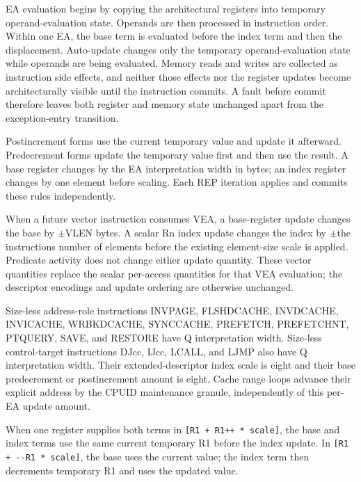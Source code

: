 EA evaluation begins by copying the architectural registers into temporary operand-evaluation state. Operands are
then processed in instruction order. Within one EA, the base term is evaluated before the index term and then the
displacement. Auto-update changes only the temporary operand-evaluation state while operands are being evaluated. Memory reads and
writes are collected as instruction side effects, and neither those effects nor the register updates become
architecturally visible until the instruction commits. A fault before commit therefore leaves both register and
memory state unchanged apart from the exception-entry transition.

Postincrement forms use the current temporary value and update it afterward. Predecrement forms update the temporary
value first and then use the result. A base register changes by the EA interpretation width in bytes; an index
register changes by one element before scaling. Each REP iteration applies and commits these rules independently.

When a future vector instruction consumes VEA, a base-register update changes the base by \(\pm\)VLEN bytes. A
scalar Rn index update changes the index by \(\pm\)the instruction\textquotesingle{}s number of elements before the existing
element-size scale is applied. Predicate activity does not change either update quantity. These vector quantities
replace the scalar per-access quantities for that VEA evaluation; the descriptor encodings and update ordering are
otherwise unchanged.

Size-less address-role instructions INVPAGE, FLSHDCACHE, INVDCACHE, INVICACHE, WRBKDCACHE, SYNCCACHE, PREFETCH,
PREFETCHNT, PTQUERY, SAVE, and RESTORE have Q interpretation width. Size-less control-target instructions DJcc, IJcc,
LCALL, and LJMP also have Q interpretation width. Their extended-descriptor index scale is eight and their base predecrement or
postincrement amount is eight. Cache range loops advance their explicit address by the CPUID maintenance granule,
independently of this per-EA update amount.

When one register supplies both terms in \texttt{[R1 + R1++ * scale]}, the base and index terms use the same
current temporary R1 before the index update. In \texttt{[R1 + {-}{-}R1 * scale]}, the base uses the current value;
the index term then decrements temporary R1 and uses the updated value.
